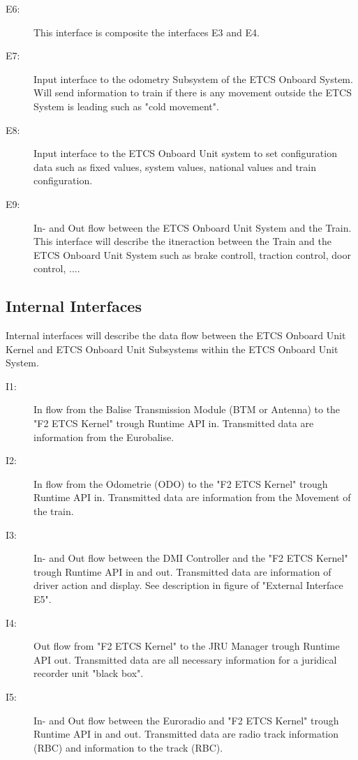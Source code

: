 \begin{description}
\item[E6:] This interface is composite the interfaces E3 and E4.

\item[E7:] Input interface to the odometry Subsystem of the ETCS Onboard System. Will send information to train if there is any movement outside the ETCS System is leading such as "cold movement".

\item[E8:] Input interface to the ETCS Onboard Unit system to set configuration data such as fixed values, system values, national values and train configuration.

\item[E9:] In- and Out flow between the ETCS Onboard Unit System and the Train. This interface will describe the itneraction between the Train and the ETCS Onboard Unit System such as brake controll, traction control, door control, ....
\end{description}


\subsection{Internal Interfaces}
Internal interfaces will describe the data flow between the ETCS Onboard Unit Kernel and ETCS Onboard Unit Subsystems within the ETCS Onboard Unit System.

\begin{description}
\item[I1:] In flow from the Balise Transmission Module (BTM or Antenna) to the "F2 ETCS Kernel" trough Runtime API in. Transmitted data are information from the Eurobalise.

\item[I2:] In flow from the Odometrie (ODO) to the "F2 ETCS Kernel" trough Runtime API in. Transmitted data are information from the Movement of the train.

\item[I3:] In- and Out flow between the DMI Controller and the "F2 ETCS Kernel" trough Runtime API in and out. Transmitted data are information of driver action and display. See description in figure of "External Interface E5".

\item[I4:] Out flow from "F2 ETCS Kernel" to the JRU Manager trough Runtime API out. Transmitted data are all necessary information for a juridical recorder unit "black box".

\item[I5:] In- and Out flow between the Euroradio and "F2 ETCS Kernel" trough Runtime API in and out. Transmitted data are radio track information (RBC) and information to the track (RBC). 
\end{description}

